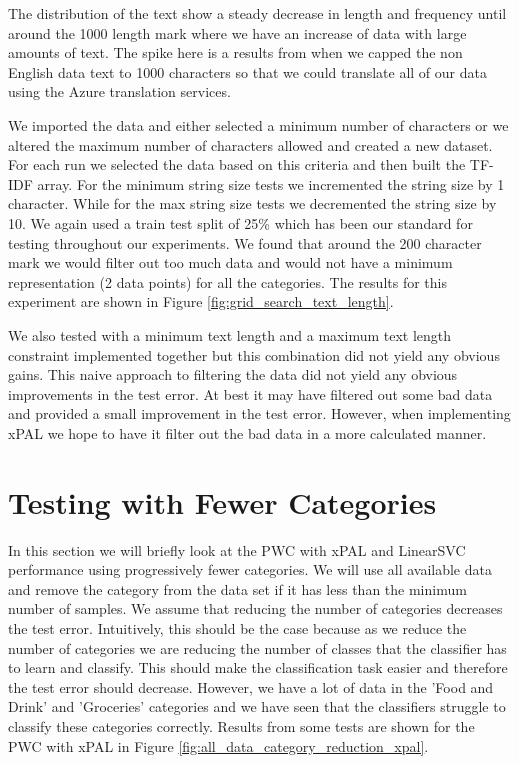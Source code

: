 The distribution of the text show a steady decrease in length and frequency until around the 1000 length mark where we have an increase of data with large amounts of text. The spike here is a results from when we capped the non English data text to 1000 characters so that we could translate all of our data using the Azure translation services.

We imported the data and either selected a minimum number of characters or we altered the maximum number of characters allowed and created a new dataset. For each run we selected the data based on this criteria and then built the TF-IDF array. For the minimum string size tests we incremented the string size by 1 character. While for the max string size tests we decremented the string size by 10. We again used a train test split of 25\% which has been our standard for testing throughout our experiments. We found that around the 200 character mark we would filter out too much data and would not have a minimum representation (2 data points) for all the categories. The results for this experiment are shown in Figure \ref{fig:grid_search_text_length}.

We also tested with a minimum text length and a maximum text length constraint implemented together but this combination did not yield any obvious gains. This naive approach to filtering the data did not yield any obvious improvements in the test error. At best it may have filtered out some bad data and provided a small improvement in the test error. However, when implementing xPAL we hope to have it filter out the bad data in a more calculated manner.

\section{Testing with Fewer Categories}

In this section we will briefly look at the PWC with xPAL and LinearSVC performance using progressively fewer categories. We will use all available data and remove the category from the data set if it has less than the minimum number of samples. We assume that reducing the number of categories decreases the test error. Intuitively, this should be the case because as we reduce the number of categories we are reducing the number of classes that the classifier has to learn and classify. This should make the classification task easier and therefore the test error should decrease. However, we have a lot of data in the 'Food and Drink' and 'Groceries' categories and we have seen that the classifiers struggle to classify these categories correctly. Results from some tests are shown for the PWC with xPAL in Figure \ref{fig:all_data_category_reduction_xpal}.

